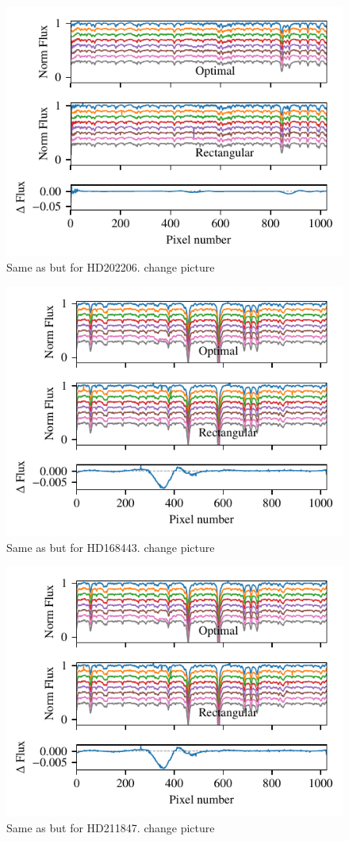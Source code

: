  \begin{figure}
     \centering
     \includegraphics[width=0.7\linewidth]{figures/reduction/bp_plots/extraction_comparision_HD4747-1_chip_4}
     \caption{Same as  but for HD202206. {\red{} change picture}}
     \label{fig:artefact_example4}
 \end{figure}
 \begin{figure}
     \centering
     \includegraphics[width=0.7\linewidth]{figures/reduction/bp_plots/extraction_comparision_HD30501-1_chip_1}
     \caption{Same as  but for HD168443. {\red{} change picture}}
     \label{fig:artefact_example5}
 \end{figure}
  \begin{figure}
     \centering
     \includegraphics[width=0.7\linewidth]{figures/reduction/bp_plots/extraction_comparision_HD30501-1_chip_1}
     \caption{Same as  but for HD211847. {\red{} change picture}}
     \label{fig:artefact_example6}
 \end{figure}
